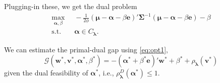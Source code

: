 \documentclass[12pt, a4paper]{article}
\newcommand{\bfw}{\boldsymbol{w} }
\newcommand{\bfmu}{\boldsymbol{\mu} }
\newcommand{\bfSigma}{\boldsymbol{\Sigma} }
\newcommand{\bfv}{\boldsymbol{v}}
\newcommand{\bfe}{\boldsymbol{e}}
\newcommand{\bfalpha}{\boldsymbol{\alpha}}
\newcommand{\bflambda}{\boldsymbol{\lambda}}
\begin{document}
Plugging-in these, we get the dual problem
$$
\begin{aligned}
  \max_{\bfalpha, \beta} &\;\; - \frac{1}{2\phi} (\bfmu - \bfalpha -\beta \bfe)' \bfSigma^{-1} (\bfmu - \bfalpha -\beta \bfe) - \beta\\
  \text{s.t.} %
   &\;\; \bfalpha \in C_{\bflambda} .
\end{aligned}
$$

We can estimate the primal-dual gap using \eqref{eq:opt1},
$$
\mathcal G(\bfw^*,\bfv^*,\bfalpha^*,\beta^*) = -(\bfalpha^* + \beta^*\bfe)'\bfw^* + \beta^* + \rho_{\bflambda}(\bfv^*)
$$
given the dual feasibility of $\bfalpha^*$, i.e., $\rho_{\bflambda}^D(\bfalpha^*) \le 1$.
\end{document}
